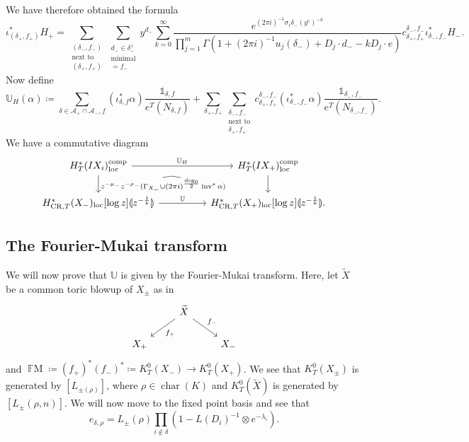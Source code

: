 \documentclass[leqno, openany]{memoir}
\theoremstyle{definition}
\theoremstyle{remark}
\theoremstyle{plain}
\theoremstyle{definition}
\theoremstyle{remark}
\newcommand{\F}{\mathbb{F}}
\newcommand{\mc}[1]{\mathcal{#1}}
\newcommand{\mr}[1]{\mathrm{#1}}
\newcommand{\on}[1]{\operatorname{#1}}
\newcommand{\wt}[1]{\widetilde{#1}}
\newcommand{\wh}[1]{\widehat{#1}}
\begin{document}
We have therefore obtained the formula
\[ \iota^*_{(\delta_+, f_+)} H_+ = \sum_{\substack{(\delta_-, f_-) \\ \text{next to}\\(\delta_+, f_+)}} \sum_{\substack{d_- \in \delta_-^{\vee} \\ \text{minimal}\\ [d_-] = f_-}} y^{d_-} \sum_{k=0}^{\infty} \frac{e^{(2\pi i)^{-1} \sigma_i \delta_- (y^e)^{-k}}}{\prod_{j=1}^m \Gamma(1+(2\pi i)^{-1} u_j(\delta_-) + D_j \cdot d_- - k D_j \cdot e)} c_{\delta_+, f_+}^{\delta_-, f_-} \iota_{\delta_-,f_-}^* H_-. \]
Now define
\[ \mathbb{U}_H(\alpha) \coloneqq \sum_{\delta \in \mc{A}_+ \cap \mc{A_-}, f} (\iota^*_{\delta, f} \alpha) \frac{\mathbb{1}_{\delta, f}}{e^T(N_{\delta, f})} + \sum_{\delta_+, f_+} \sum_{\substack{\delta_-, f_- \\ \text{next to}\\ \delta_+, f_+}} c_{\delta_+,f_+}^{\delta_-,f_-} (\iota_{\delta_-, f_-}^* \alpha) \frac{\mathbb{1}_{\delta_-, f_-}}{e^T(N_{\delta_-, f_-})}. \]
We have a commutative diagram
\begin{equation*}
\begin{tikzcd}
    H_T^*(IX_i)_{\mr{loc}}^{\mr{comp}} \ar{rr}{\mathbb{U}_H} \ar{d}{z^{-\mu_-} z^{-\rho_-} (\wh{\Gamma_{X_-} \cup (2\pi i)^{\frac{\deg_0}{2}}} \on{inv}^* \alpha)} & & H_T^*(IX_+)_{\mr{loc}}^{\mr{comp}} \ar{d} \\
    H^*_{\mr{CR}, T}(X_-)_{\mr{loc}}[\log z]\llparenthesis z^{-\frac{1}{k}} \rrparenthesis \ar{rr}{\mathbb{U}} & & H^*_{\mr{CR}, T}(X_+)_{\mr{loc}}[\log z]\llparenthesis z^{-\frac{1}{k}} \rrparenthesis.
\end{tikzcd}
\end{equation*}

\subsection{The Fourier-Mukai transform}%
\label{sub:The Fourier-Mukai transform}
We will now prove that $\mathbb{U}$ is given by the Fourier-Mukai transform. Here, let $\wt{X}$ be a common toric blowup of $X_{\pm}$ as in
\begin{equation*}
\begin{tikzcd}
    & \wt{X} \ar{dl}{f_+} \ar{dr}{f_-} \\
    X_+ & & X_-
\end{tikzcd}
\end{equation*}
and $\on{\F M} \coloneqq (f_+)^* (f_-)^* \coloneqq K_T^0(X_-) \to K_T^0(X_+)$. We see that $K_T^0(X_{\pm})$ is generated by $[L_{\pm(\rho)}]$, where $\rho \in \on{char}(K)$ and $K_T^0(\wt{X})$ is generated by $[L_{\pm}(\rho, n)]$. We will now move to the fixed point basis and see that
\[ e_{\delta, \rho} = L_{\pm}(\rho) \prod_{i \notin \delta}(1-L(D_i)^{-1} \otimes e^{-\lambda_i}). \]
\end{document}

